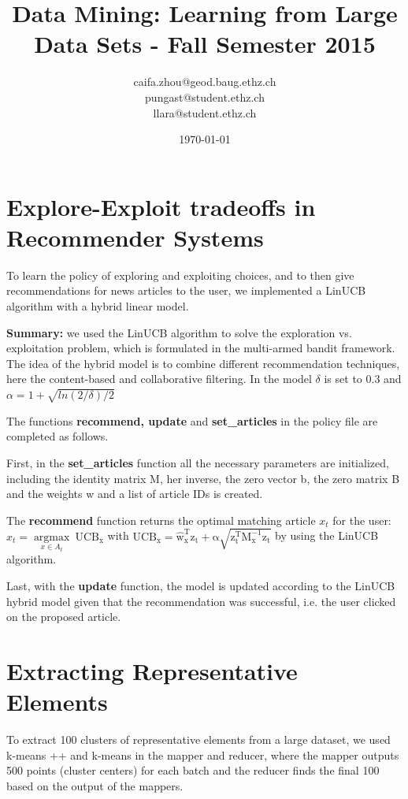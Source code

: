 \documentclass[a4paper, 11pt]{article}
\title{Data Mining: Learning from Large Data Sets - Fall Semester 2015}
\author{caifa.zhou@geod.baug.ethz.ch\\ pungast@student.ethz.ch\\ llara@student.ethz.ch\\}
\date{\today}
\begin{document}
\maketitle

\section*{Explore-Exploit tradeoffs in Recommender Systems} 

To learn the policy of exploring and exploiting choices, and to then give recommendations for news articles to the user, we implemented a LinUCB algorithm with a hybrid linear model.

\textbf{Summary:} we used the LinUCB algorithm to solve the exploration vs. exploitation problem, which is formulated in the multi-armed bandit framework. The idea of the hybrid model is to combine different recommendation techniques, here the content-based and collaborative filtering. In the model $\delta$ is set to 0.3 and $\alpha = 1 + \sqrt{ln(2/\delta)/2}$ 

The functions \textbf{recommend, update} and \textbf{set\_articles} in the policy file are completed as follows.  

First, in the \textbf{set\_articles} function all the necessary parameters are initialized, including the identity matrix M, her inverse, the zero vector b, the zero matrix B and the weights w and a list of article IDs is created.

The \textbf{recommend} function returns the optimal matching article $x_{t}$ for the user: 
$x_{t} = \underset{x\in A_{t}}{\operatorname{argmax}}~\mathrm{UCB_{x}}$ with $\mathrm{UCB_{x}} = \mathrm{\hat{w}_{x}^{T}z_{t} + \alpha \sqrt{z_{t}^{T}M_{x}^{-1}z_{t}}}$ by using the LinUCB algorithm. 

Last, with the \textbf{update} function, the model is updated according to the LinUCB hybrid model given that the recommendation was successful, i.e. the user clicked on the proposed article. 
 

\pagebreak


\section*{Extracting Representative Elements} 

To extract 100 clusters of representative elements from a large dataset, we used k-means ++ and k-means in the mapper and reducer, where the mapper outputs 500 points (cluster centers) for each batch and the reducer finds the final 100 based on the output of the mappers.
\end{document}
